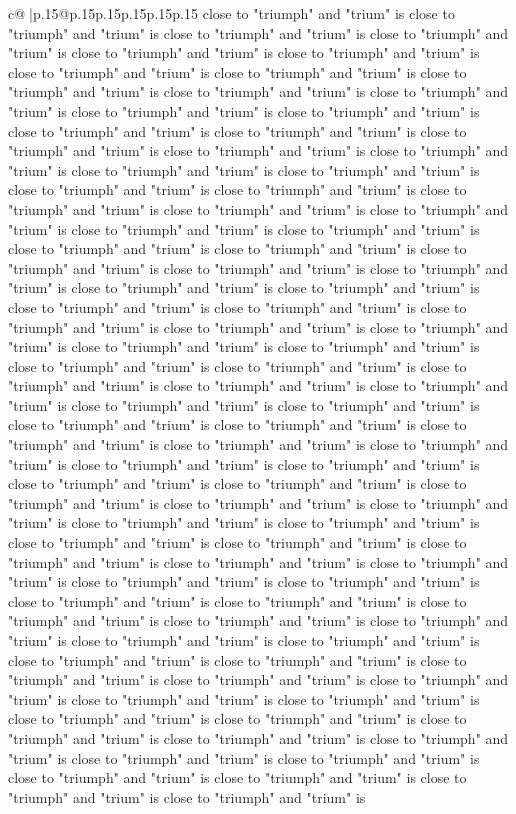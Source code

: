 \documentclass{article}
\begin{document}
{\begin{supertabular}{c@{$\;$}|p{.15\linewidth}@{}p{.15\linewidth}p{.15\linewidth}p{.15\linewidth}p{.15\linewidth}p{.15\linewidth}}
{{{close to "triumph" and "trium" is close to "triumph" and "trium" is close to "triumph" and "trium" is close to "triumph" and "trium" is close to "triumph" and "trium" is close to "triumph" and "trium" is close to "triumph" and "trium" is close to "triumph" and "trium" is close to "triumph" and "trium" is close to "triumph" and "trium" is close to "triumph" and "trium" is close to "triumph" and "trium" is close to "triumph" and "trium" is close to "triumph" and "trium" is close to "triumph" and "trium" is close to "triumph" and "trium" is close to "triumph" and "trium" is close to "triumph" and "trium" is close to "triumph" and "trium" is close to "triumph" and "trium" is close to "triumph" and "trium" is close to "triumph" and "trium" is close to "triumph" and "trium" is close to "triumph" and "trium" is close to "triumph" and "trium" is close to "triumph" and "trium" is close to "triumph" and "trium" is close to "triumph" and "trium" is close to "triumph" and "trium" is close to "triumph" and "trium" is close to "triumph" and "trium" is close to "triumph" and "trium" is close to "triumph" and "trium" is close to "triumph" and "trium" is close to "triumph" and "trium" is close to "triumph" and "trium" is close to "triumph" and "trium" is close to "triumph" and "trium" is close to "triumph" and "trium" is close to "triumph" and "trium" is close to "triumph" and "trium" is close to "triumph" and "trium" is close to "triumph" and "trium" is close to "triumph" and "trium" is close to "triumph" and "trium" is close to "triumph" and "trium" is close to "triumph" and "trium" is close to "triumph" and "trium" is close to "triumph" and "trium" is close to "triumph" and "trium" is close to "triumph" and "trium" is close to "triumph" and "trium" is close to "triumph" and "trium" is close to "triumph" and "trium" is close to "triumph" and "trium" is close to "triumph" and "trium" is close to "triumph" and "trium" is close to "triumph" and "trium" is close to "triumph" and "trium" is close to "triumph" and "trium" is close to "triumph" and "trium" is close to "triumph" and "trium" is close to "triumph" and "trium" is close to "triumph" and "trium" is close to "triumph" and "trium" is close to "triumph" and "trium" is close to "triumph" and "trium" is close to "triumph" and "trium" is close to "triumph" and "trium" is close to "triumph" and "trium" is close to "triumph" and "trium" is close to "triumph" and "trium" is close to "triumph" and "trium" is close to "triumph" and "trium" is close to "triumph" and "trium" is close to "triumph" and "trium" is close to "triumph" and "trium" is close to "triumph" and "trium" is close to "triumph" and "trium" is close to "triumph" and "trium" is close to "triumph" and "trium" is close to "triumph" and "trium" is close to "triumph" and "trium" is close to "triumph" and "trium" is close to "triumph" and "trium" is close to "triumph" and "trium" is close to "triumph" and "trium" is close to "triumph" and "trium" is close to "triumph" and "trium" is close to "triumph" and "trium" is close to "triumph" and "trium" is close to "triumph" and "trium" is close to "triumph" and "trium" is close to "triumph" and "trium" is }}}
\end{supertabular}}
\end{document}
